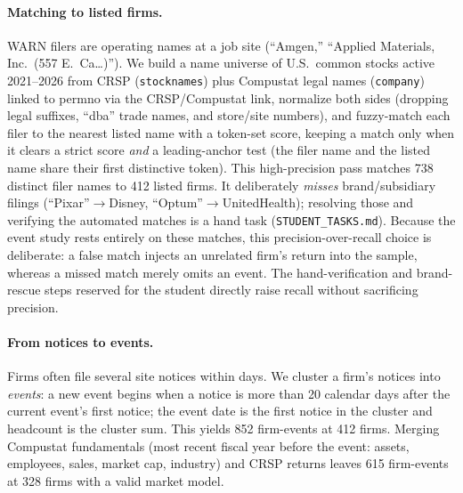 \documentclass[12pt]{article}
\begin{document}
\paragraph{Matching to listed firms.} WARN filers are operating names at a job
site (``Amgen,'' ``Applied Materials, Inc.\ (557 E.\ Ca\ldots)''). We build a name
universe of U.S.\ common stocks active 2021--2026 from CRSP (\texttt{stocknames})
plus Compustat legal names (\texttt{company}) linked to permno via the
CRSP/Compustat link, normalize both sides (dropping legal suffixes, ``dba'' trade
names, and store/site numbers), and fuzzy-match each filer to the nearest listed
name with a token-set score, keeping a match only when it clears a strict score
\emph{and} a leading-anchor test (the filer name and the listed name share their
first distinctive token). This high-precision pass matches 738 distinct filer
names to 412 listed firms. It deliberately \emph{misses} brand/subsidiary filings
(``Pixar''$\to$Disney, ``Optum''$\to$UnitedHealth); resolving those and verifying
the automated matches is a hand task (\texttt{STUDENT\_TASKS.md}). Because the
event study rests entirely on these matches, this precision-over-recall choice is
deliberate: a false match injects an unrelated firm's return into the sample,
whereas a missed match merely omits an event. The hand-verification and
brand-rescue steps reserved for the student directly raise recall without
sacrificing precision.

\paragraph{From notices to events.} Firms often file several site notices within
days. We cluster a firm's notices into \emph{events}: a new event begins when a
notice is more than 20 calendar days after the current event's first notice; the
event date is the first notice in the cluster and headcount is the cluster sum.
This yields 852 firm-events at 412 firms. Merging Compustat fundamentals (most
recent fiscal year before the event: assets, employees, sales, market cap,
industry) and CRSP returns leaves 615 firm-events at 328 firms with a valid
market model.
\end{document}
